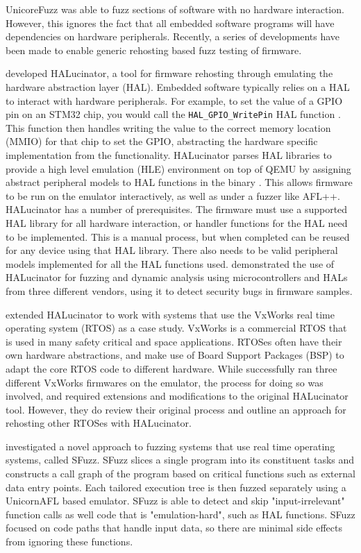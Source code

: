 \documentclass[../report.tex]{subfiles}
\begin{document}
UnicoreFuzz was able to fuzz sections of software with no hardware interaction.
However, this ignores the fact that all embedded software programs will have
dependencies on hardware peripherals. Recently, a series of developments have
been made to enable generic rehosting based fuzz testing of firmware.

\citet{HALucinator_2020} developed HALucinator, a tool for firmware rehosting
through emulating the hardware abstraction layer (HAL). Embedded software
typically relies on a HAL to interact with hardware peripherals. For example,
to set the value of a GPIO pin on an STM32 chip, you would call the
\lstinline{HAL_GPIO_WritePin} HAL function \citep{stm32hal}. This function then
handles writing the value to the correct memory location (MMIO) for that chip
to set the GPIO, abstracting the hardware specific implementation from the
functionality. HALucinator parses HAL libraries to provide a high level
emulation (HLE) environment on top of QEMU by assigning abstract peripheral
models to HAL functions in the binary \citep{HALucinator_2020}. This allows
firmware to be run on the emulator interactively, as well as under a fuzzer
like AFL++. HALucinator has a number of prerequisites. The firmware must use a
supported HAL library for all hardware interaction, or handler functions for
the HAL need to be implemented. This is a manual process, but when completed
can be reused for any device using that HAL library. There also needs to be
valid peripheral models implemented for all the HAL functions used.
\citet{HALucinator_2020} demonstrated the use of HALucinator for fuzzing and
dynamic analysis using microcontrollers and HALs from three different vendors,
using it to detect security bugs in firmware samples.

\citet{Clements_2021} extended HALucinator to work with systems that use the
VxWorks real time operating system (RTOS) as a case study. VxWorks is a
commercial RTOS that is used in many safety critical and space applications.
RTOSes often have their own hardware abstractions, and make use of Board
Support Packages (BSP) to adapt the core RTOS code to different hardware.
While \citet{Clements_2021} successfully ran three different VxWorks firmwares
on the emulator, the process for doing so was involved, and required extensions
and modifications to the original HALucinator tool. However, they do review
their original process and outline an approach for rehosting other RTOSes with
HALucinator.

\citet{Chen_2022} investigated a novel approach to fuzzing systems that use
real time operating systems, called SFuzz. SFuzz slices a single program into
its constituent tasks and constructs a call graph of the program based on critical
functions such as external data entry points. Each tailored execution tree is
then fuzzed separately using a UnicornAFL based emulator. SFuzz is able to
detect and skip "input-irrelevant" function calls as well code that is
"emulation-hard", such as HAL functions. SFuzz focused on code paths that
handle input data, so there are minimal side effects from ignoring these
functions.
\end{document}
